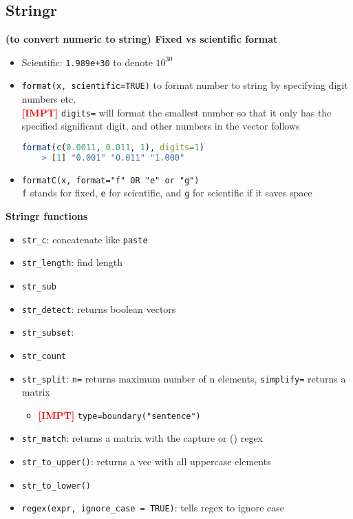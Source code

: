 \documentclass{article}
\newcommand{\impt}[0]{\textcolor{red}{\textbf{[IMPT] }}}
\begin{document}
\begin{multicols}{2}
\section{Stringr}
\textbf{(to convert numeric to string) Fixed vs scientific format}
\begin{itemize}
	\item Scientific: \texttt{1.989e+30} to denote $10^30$
	\item \texttt{format(x, scientific=TRUE)} to format number to string by specifying digit numbers etc.\\
	\impt \texttt{digits=} will format the smallest number so that it only has the specified significant digit, and other numbers in the vector follows
	\begin{lstlisting}[language=R]
	format(c(0.0011, 0.011, 1), digits=1)
	> [1] "0.001" "0.011" "1.000"
	\end{lstlisting}
	\item \texttt{formatC(x, format="f" OR "e" or "g")}\\
	\texttt{f} stands for fixed, \texttt{e} for scientific, and \texttt{g} for scientific if it saves space
\end{itemize}
\textbf{Stringr functions}
\begin{itemize}
	\item \texttt{str\_c}: concatenate like \texttt{paste}
	\item \texttt{str\_length}: find length
	\item \texttt{str\_sub}
	\item \texttt{str\_detect}: returns boolean vectors
	\item \texttt{str\_subset}:
	\item \texttt{str\_count}
	\item \texttt{str\_split}: \texttt{n=} returns maximum number of n elements, \texttt{simplify=} returns a matrix
	\begin{itemize}
		\item \impt \texttt{type=boundary("sentence")}
	\end{itemize}
	\item \texttt{str\_match}: returns a matrix with the capture or () regex
	\item \texttt{str\_to\_upper()}: returns a vec with all uppercase elements
	\item \texttt{str\_to\_lower()}
	\item \texttt{regex(expr, ignore\_case = TRUE)}: tells regex to ignore case
\end{itemize}

\end{multicols}
\end{document}
